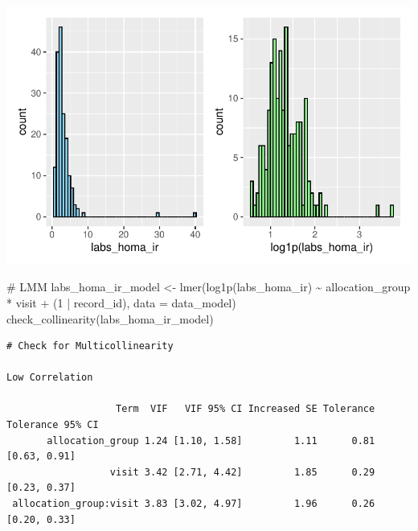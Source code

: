 \documentclass[
  12pt,
]{article}
\newenvironment{Shaded}{\begin{snugshade}}{\end{snugshade}}
\newcommand{\AttributeTok}[1]{\textcolor[rgb]{0.40,0.45,0.13}{#1}}
\newcommand{\CommentTok}[1]{\textcolor[rgb]{0.37,0.37,0.37}{#1}}
\newcommand{\DecValTok}[1]{\textcolor[rgb]{0.68,0.00,0.00}{#1}}
\newcommand{\FunctionTok}[1]{\textcolor[rgb]{0.28,0.35,0.67}{#1}}
\newcommand{\NormalTok}[1]{\textcolor[rgb]{0.00,0.23,0.31}{#1}}
\newcommand{\OtherTok}[1]{\textcolor[rgb]{0.00,0.23,0.31}{#1}}
\newcommand{\SpecialCharTok}[1]{\textcolor[rgb]{0.37,0.37,0.37}{#1}}
\begin{document}
\includegraphics{Outcomes_files/figure-pdf/labs_homa_ir_1-1.pdf}

\begin{Shaded}
\begin{Highlighting}[]
\CommentTok{\# LMM}
\NormalTok{labs\_homa\_ir\_model }\OtherTok{\textless{}{-}} \FunctionTok{lmer}\NormalTok{(}\FunctionTok{log1p}\NormalTok{(labs\_homa\_ir) }\SpecialCharTok{\textasciitilde{}}\NormalTok{ allocation\_group }\SpecialCharTok{*}\NormalTok{ visit }\SpecialCharTok{+} 
\NormalTok{(}\DecValTok{1} \SpecialCharTok{|}\NormalTok{ record\_id), }\AttributeTok{data =}\NormalTok{ data\_model)}
\FunctionTok{check\_collinearity}\NormalTok{(labs\_homa\_ir\_model)}
\end{Highlighting}
\end{Shaded}

\begin{verbatim}
# Check for Multicollinearity

Low Correlation

                   Term  VIF   VIF 95% CI Increased SE Tolerance Tolerance 95% CI
       allocation_group 1.24 [1.10, 1.58]         1.11      0.81     [0.63, 0.91]
                  visit 3.42 [2.71, 4.42]         1.85      0.29     [0.23, 0.37]
 allocation_group:visit 3.83 [3.02, 4.97]         1.96      0.26     [0.20, 0.33]
\end{verbatim}
\end{document}
